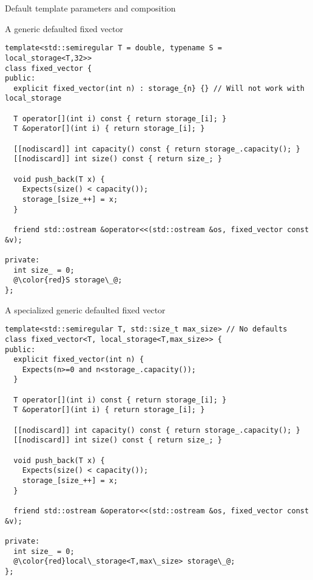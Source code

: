 \begin{frame}[t,fragile]{Default template parameters and composition}
\begin{block}{A generic defaulted fixed vector}
\begin{lstlisting}[basicstyle=\tiny,escapechar=@]
template<std::semiregular T = double, typename S = local_storage<T,32>>
class fixed_vector {
public:
  explicit fixed_vector(int n) : storage_{n} {} // Will not work with local_storage

  T operator[](int i) const { return storage_[i]; }
  T &operator[](int i) { return storage_[i]; }

  [[nodiscard]] int capacity() const { return storage_.capacity(); }
  [[nodiscard]] int size() const { return size_; }

  void push_back(T x) {
    Expects(size() < capacity());
    storage_[size_++] = x;
  }

  friend std::ostream &operator<<(std::ostream &os, fixed_vector const &v);

private:
  int size_ = 0;
  @\color{red}S storage\_@;
};
\end{lstlisting}
\end{block}
\end{frame}

\begin{frame}[t,fragile]
\begin{block}{A specialized generic defaulted fixed vector}
\begin{lstlisting}[basicstyle=\tiny, escapechar=@]
template<std::semiregular T, std::size_t max_size> // No defaults
class fixed_vector<T, local_storage<T,max_size>> {
public:
  explicit fixed_vector(int n) {
    Expects(n>=0 and n<storage_.capacity());
  }

  T operator[](int i) const { return storage_[i]; }
  T &operator[](int i) { return storage_[i]; }

  [[nodiscard]] int capacity() const { return storage_.capacity(); }
  [[nodiscard]] int size() const { return size_; }

  void push_back(T x) {
    Expects(size() < capacity());
    storage_[size_++] = x;
  }

  friend std::ostream &operator<<(std::ostream &os, fixed_vector const &v);

private:
  int size_ = 0;
  @\color{red}local\_storage<T,max\_size> storage\_@;
};
\end{lstlisting}
\end{block}
\end{frame}

